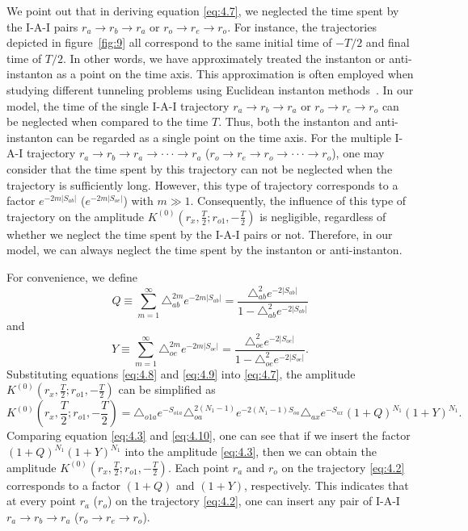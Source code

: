 \documentclass[12pt]{article}
\begin{document}
We point out that in deriving equation \eqref{eq:4.7}, we neglected the time spent by the I-A-I pairs $r_{a}\rightarrow r_{b}\rightarrow r_{a}$ or $r_{o}\rightarrow r_{e}\rightarrow r_{o}$. For instance, the trajectories depicted in figure~\ref{fig:9} all correspond to the same initial time of $-T/2$ and final time of $T/2$. In other words, we have approximately treated the instanton or anti-instanton as  a point  on the time axis. This approximation is often employed when studying different tunneling problems using Euclidean instanton methods~\cite{SC2,UHPP,RHB}. In our model, the time of the single I-A-I trajectory $r_{a}\rightarrow r_{b}\rightarrow r_{a}$ or $r_{o}\rightarrow r_{e}\rightarrow r_{o}$ can be neglected when compared to the time $T$. Thus, both the instanton and anti-instanton can be regarded as a single point on the time axis. For the multiple I-A-I trajectory $r_{a}\rightarrow r_{b}\rightarrow r_{a}\rightarrow\cdot\cdot\cdot\rightarrow r_{a}$ ($r_{o}\rightarrow r_{e}\rightarrow r_{o}\rightarrow\cdot\cdot\cdot\rightarrow r_{o}$), one may consider that the time spent by this trajectory can not be neglected when the trajectory is sufficiently long. However, this type of trajectory corresponds to a factor $e^{-2m|S_{ab}|}$ ($e^{-2m|S_{oe}|}$) with $m\gg1$. Consequently, the influence of this type of trajectory on the amplitude $K^{(0)}(r_{x},\frac{T}{2}; r_{o1}, -\frac{T}{2})$ is negligible, regardless of whether we neglect the time spent by the I-A-I pairs or not. Therefore, in our model, we can always neglect the time spent by the instanton or anti-instanton.

For convenience, we define
\begin{equation}
\label{eq:4.8}%
Q\equiv\sum_{m=1}^{\infty}\triangle_{ab}^{2m}e^{-2m|S_{ab}|}=\frac{\triangle_{ab}^{2}e^{-2|S_{ab}|}}{1-\triangle_{ab}^{2}e^{-2|S_{ab}|}}
\end{equation}
and
\begin{equation}
\label{eq:4.9}%
Y\equiv\sum_{m=1}^{\infty}\triangle_{oe}^{2m}e^{-2m|S_{oe}|}=\frac{\triangle_{oe}^{2}e^{-2|S_{oe}|}}{1-\triangle_{oe}^{2}e^{-2|S_{oe}|}}.
\end{equation}
Substituting equations \eqref{eq:4.8} and \eqref{eq:4.9} into \eqref{eq:4.7}, the amplitude $K^{(0)}(r_{x},\frac{T}{2}; r_{o1}, -\frac{T}{2})$ can be simplified as
\begin{equation}
\label{eq:4.10}%
K^{(0)}(r_{x},\frac{T}{2}; r_{o1}, -\frac{T}{2})=\triangle_{o1a}e^{-S_{o1a}}\triangle_{oa}^{2(N_{1}-1)}e^{-2(N_{1}-1)S_{oa}}\triangle_{ax}e^{-S_{ax}}(1+Q)^{N_{1}}(1+Y)^{N_{1}}.
\end{equation}
Comparing equation \eqref{eq:4.3} and \eqref{eq:4.10}, one can see that if we insert the factor $(1+Q)^{N_{1}}(1+Y)^{N_{1}}$ into the amplitude \eqref{eq:4.3}, then we can obtain the amplitude $K^{(0)}(r_{x},\frac{T}{2}; r_{o1}, -\frac{T}{2})$. Each point $r_{a}$ and $r_{o}$ on the trajectory \eqref{eq:4.2} corresponds to a factor $(1+Q)$ and $(1+Y)$, respectively.
This indicates that at every point $r_{a}$ ($r_{o}$)  on the trajectory \eqref{eq:4.2}, one can insert any pair of I-A-I $r_{a}\rightarrow r_{b}\rightarrow r_{a}$ ($r_{o}\rightarrow r_{e}\rightarrow r_{o}$).
\end{document}
